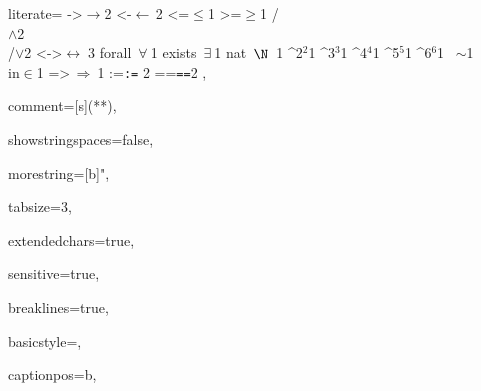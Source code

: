 {%
 literate=
        {->}{{$\rightarrow$}}2
	{<-}{{$\leftarrow\,$}}2
        {<=}{{$\leq$}}1
        {>=}{{$\geq$}}1
        {/\\}{{$\wedge$}}2
        {\\/}{{$\vee$}}2
        {<->}{{$\leftrightarrow\;$}}3
	{forall\ }{{$\forall\ \!$}}1
	{exists\ }{{$\exists\ \!$}}1
	{nat\ }{{$\N$\ }}1
	{^2}{{$^2$}}1
	{^3}{{$^3$}}1
	{^4}{{$^4$}}1
	{^5}{{$^5$}}1
	{^6}{{$^6$}}1
        {~}{{$\sim$}}1
        {\\in}{{$\in$}}1
 	{=>}{{$\,\Rightarrow\ $}}1
        {:=}{{{\tt:=}\,\,}}2
        {==}{{{\tt==}}}2
,

comment=[s]{(*}{*)},

showstringspaces=false,

morestring=[b]",

tabsize=3,

extendedchars=true,

sensitive=true,

breaklines=true,

basicstyle=\ttfamily\footnotesize,

captionpos=b,

}
